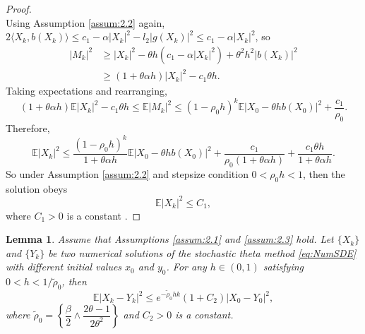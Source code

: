 \documentclass{article}
\newtheorem{lemma}[theorem]{Lemma}
\begin{document}
\begin{proof}
\[\]  
Using Assumption \ref{assum:2.2} again, $ 2\langle X_k, b(X_k) \rangle \leq c_1 - \alpha |X_k|^2 - l_2 |g(X_k)|^2 \leq c_1 - \alpha |X_k|^2 $, so  
\[
\begin{aligned}
	|M_k|^2 &\geq |X_k|^2 - \theta h (c_1 - \alpha |X_k|^2) + \theta^2 h^2 |b(X_k)|^2 \\
	&\geq (1 + \theta \alpha h)|X_k|^2 - c_1 \theta h.
\end{aligned}
\]  
Taking expectations and rearranging,  
\[
(1 + \theta \alpha h) \mathbb{E}|X_k|^2 - c_1 \theta h \leq \mathbb{E}|M_k|^2 \leq (1 - \rho_0 h)^k \mathbb{E}|X_0 - \theta h b(X_0)|^2 + \frac{c_1}{\rho_0}.
\]  
Therefore,  
\[
\mathbb{E}|X_k|^2 \leq \frac{(1 - \rho_0 h)^k}{1 + \theta \alpha h} \mathbb{E}|X_0 - \theta h b(X_0)|^2 + \frac{c_1}{\rho_0 (1 + \theta \alpha h)} + \frac{c_1 \theta h}{1 + \theta \alpha h}.
\]  
So under Assumption \ref{assum:2.2} and stepsize condition $ 0 < \rho_0 h < 1 $, then the solution obeys
\[
\mathbb{E}|X_k|^2 \leq C_1,
\]
where $C_1 > 0$ is a constant .
\end{proof}
\begin{lemma}\label{lem:3.2}
Assume that Assumptions \ref{assum:2.1} and \ref{assum:2.3} hold. Let $\{X_k\}$ and $\{Y_k\}$ be two numerical solutions of the stochastic theta method \eqref{eq:NumSDE} with different initial values $x_0$ and $y_0$. For any $h\in(0,1)$ satisfying $0 < h < 1/\tilde{\rho}_0$, then
\[
\mathbb{E}|X_k-Y_k|^2 \leq e^{-\tilde{\rho}_0 h k}(1+C_2) |X_0 - Y_0|^2,
\]
where $\tilde{\rho}_0 = \left\{\dfrac{\beta}{2} \wedge \dfrac{2\theta-1}{2\theta^2}\right\}$ and $C_2 > 0$ is a constant.
\end{lemma}
\end{document}
